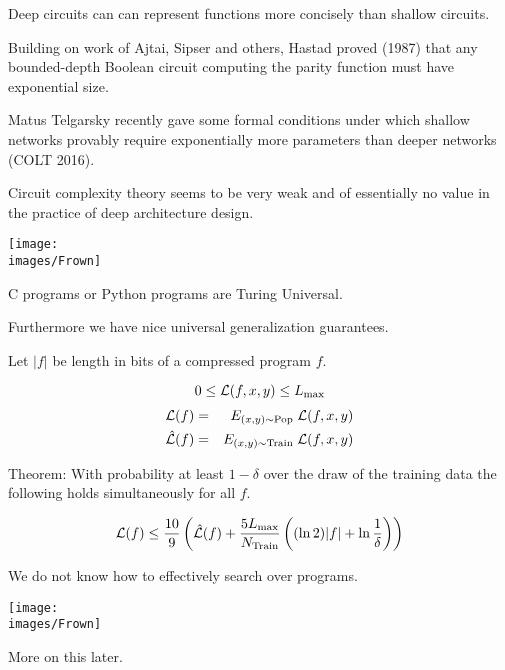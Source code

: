 {Deep circuits can can represent functions more concisely than shallow circuits.

\vfill
Building on work of Ajtai, Sipser and others, Hastad proved (1987) that any bounded-depth Boolean circuit computing the parity function must have exponential size. 

\vfill
Matus Telgarsky recently gave some formal conditions under which shallow networks provably require exponentially more parameters than deeper networks (COLT 2016).



Circuit complexity theory seems to be very weak and of essentially no value in the practice of deep architecture design.

\vfill
\centerline{\texttt{[image: \\images/Frown]}}


C programs or Python programs are Turing Universal.

\vfill
Furthermore we have nice universal generalization guarantees.


Let $|f|$ be length in bits of a compressed program $f$.

\vfill
$$0 \leq {\cal L}(f,x,y) \leq L_{\max}$$
\begin{eqnarray*}
{\cal L}(f)  & = &  E_{(x,y)\sim \mathrm{Pop}}\;{\cal L}(f,x,y) \\
\hat{{\cal L}}(f) & = & E_{(x,y)\sim \mathrm{Train}}\;{\cal L}(f,x,y)
\end{eqnarray*}

\vfill
Theorem: With probability at least $1-\delta$ over the draw of the training data the following holds simultaneously for all $f$.

{\color{red} $${\cal L}(f) \leq \frac{10}{9}\left(\hat{{\cal L}}(f) + \frac{5L_{\max}}{N_\mathrm{Train}}\left((\ln 2)|f| +\ln\frac{1}{\delta}\right)\right)$$}


We do not know how to effectively search over programs.

\vfill
\centerline{\texttt{[image: \\images/Frown]}}

\vfill
More on this later.




}
